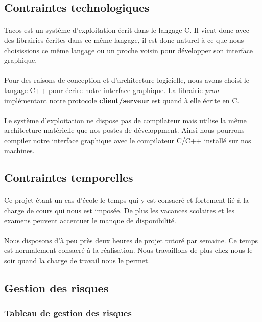 \subsection{Contraintes technologiques}
\paragraph{}
Tacos est un système d'exploitation écrit dans le langage C. Il vient donc avec des librairies écrites dans ce même langage, il est donc naturel à ce que nous choisissions ce même langage ou un proche voisin pour développer son interface graphique.
\paragraph{}
Pour des raisons de conception et d'architecture logicielle, nous avons choisi le langage C++ pour écrire notre interface graphique. La librairie \textit{pron} implémentant notre protocole \textbf{client/serveur} est quand à elle écrite en C. 
\paragraph{}
Le système d'exploitation ne dispose pas de compilateur mais utilise la même architecture matérielle que nos postes de développment. Ainsi nous pourrons compiler notre interface graphique avec le compilateur C/C++ installé sur nos machines.
\subsection{Contraintes temporelles}
\paragraph{}
Ce projet étant un cas d'école le temps qui y est consacré et fortement lié à la charge de cours qui nous est imposée. 
De plus les vacances scolaires et les examens peuvent accentuer le manque de disponibilité.
\paragraph{}
Nous disposons d'à peu près deux heures de projet tutoré par semaine. Ce temps est normalement consacré à la réalisation. Nous travaillons de plus chez nous le soir quand la charge de travail nous le permet.
\subsection{Gestion des risques}
\subsubsection{Tableau de gestion des risques}